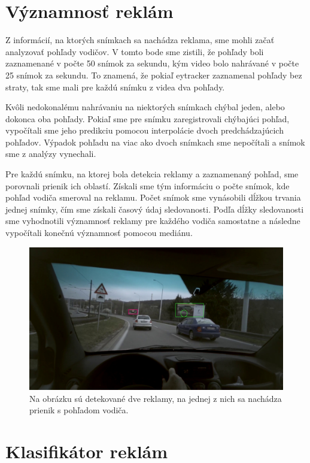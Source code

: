 \section{Významnosť reklám}

Z informácií, na ktorých snímkach sa nachádza reklama, sme mohli začať analyzovať pohľady vodičov. V tomto bode sme zistili, že pohľady boli zaznamenané v počte 50 snímok za sekundu, kým video bolo nahrávané v počte 25 snímok za sekundu. To znamená, že pokiaľ eytracker zaznamenal pohľady bez straty, tak sme mali pre každú snímku z videa dva pohľady.

Kvôli nedokonalému nahrávaniu na niektorých snímkach chýbal jeden, alebo dokonca oba pohľady. Pokiaľ sme pre snímku zaregistrovali chýbajúci pohľad, vypočítali sme jeho predikciu pomocou interpolácie dvoch predchádzajúcich pohľadov. Výpadok pohľadu na viac ako dvoch snímkach sme nepočítali a snímok sme z analýzy vynechali.

Pre každú snímku, na ktorej bola detekcia reklamy a zaznamenaný pohľad, sme porovnali prienik ich oblastí. Získali sme tým informáciu o počte snímok, kde pohľad vodiča smeroval na reklamu. Počet snímok sme vynásobili dĺžkou trvania jednej snímky, čím sme získali časový údaj sledovanosti. Podľa dĺžky sledovanosti sme vyhodnotili významnosť reklamy pre každého vodiča samostatne a následne vypočítali konečnú významnosť pomocou mediánu.

 \begin{figure}[ht]
     \centering
     \includegraphics[width=1\textwidth]{images/04/iou.jpg}
     \caption{Na obrázku sú detekované dve reklamy, na jednej z nich sa nachádza prienik s pohľadom vodiča.}
     \label{img:tracking}
 \end{figure}

\section{Klasifikátor reklám}

